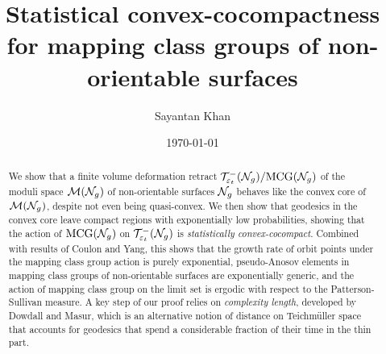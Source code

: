 \documentclass[12pt, reqno]{amsart}
\title[Statistical convex-cocompactness for non-orientable mapping class groups]{Statistical convex-cocompactness for mapping class groups of non-orientable surfaces}
\author{Sayantan Khan}
\date{\today}
\begin{document}
\begin{abstract}
  We show that a finite volume deformation retract $\mathcal{T}_{\varepsilon_t}^{-}(\mathcal{N}_g)/\mathrm{MCG}(\mathcal{N}_g)$ of the moduli space $\mathcal{M}(\mathcal{N}_g)$ of non-orientable surfaces $\mathcal{N}_g$ behaves like the convex core of $\mathcal{M}(\mathcal{N}_g)$, despite not even being quasi-convex.
  We then show that geodesics in the convex core leave compact regions with exponentially low probabilities, showing that the action of $\mathrm{MCG}(\mathcal{N}_g)$ on $\mathcal{T}_{\varepsilon_t}^{-}(\mathcal{N}_g)$ is \emph{statistically convex-cocompact}.
  Combined with results of Coulon and Yang, this shows that the growth rate of orbit points under the mapping class group action is purely exponential, pseudo-Anosov elements in mapping class groups of non-orientable surfaces are exponentially generic, and the action of mapping class group on the limit set is ergodic with respect to the Patterson-Sullivan measure.
  A key step of our proof relies on \emph{complexity length}, developed by Dowdall and Masur, which is an alternative notion of distance on Teichmüller space that accounts for geodesics that spend a considerable fraction of their time in the thin part.
\end{abstract}
\maketitle












\appendix



\printbibliography
\end{document}
